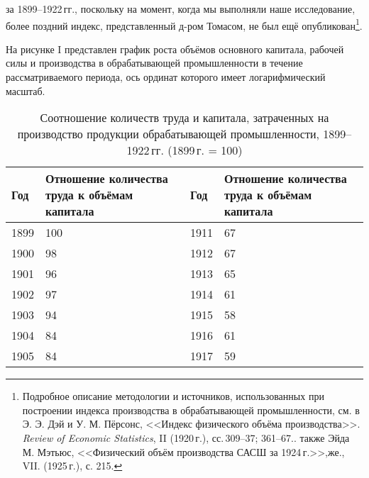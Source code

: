 \documentclass[leqno]{article}  %
\begin{document}
за 1899--1922\,гг., поскольку на момент, когда мы выполняли наше исследование, более поздний индекс, представленный д-ром Томасом, не был ещё опубликован\footnote{Подробное описание методологии и источников, использованных при построении индекса производства в обрабатывающей промышленности, см. в Э. Э. Дэй и У. М. Пёрсонс, <<Индекс физического объёма производства>>. \emph{Review of Economic Statistics}, II (1920\,г.), сс.\,309--37; 361--67.. также Эйда М. Мэтьюс, <<Физический объём производства САСШ за 1924\,г.>>, же., VII. (1925\,г.), с. 215.}.
\par
На рисунке I представлен график роста объёмов основного капитала, рабочей силы и производства в обрабатывающей промышленности в течение рассматриваемого периода, ось ординат которого имеет логарифмический масштаб.
\begin{table}
\centering
\footnotesize{
\caption{Соотношение количеств труда и капитала, затраченных на производство продукции обрабатывающей промышленности, 1899--1922\,гг. (1899\,г. = 100)}%
\label{tab5}%
\begin{tabular}{p{}|p{}||p{}|p{}}
\hline
Год & Отношение количества труда к объёмам капитала & Год & Отношение количества труда к объёмам капитала \\
\hline
1899 & \hfill 100 & \hspace*{2.5mm} 1911 & \hfill 67 \hspace*{2.5mm} \\
1900 & \hfill 98 & \hspace*{2.5mm} 1912 & \hfill 67 \hspace*{2.5mm} \\
1901 & \hfill 96 & \hspace*{2.5mm} 1913 & \hfill 65 \hspace*{2.5mm} \\
1902 & \hfill 97 & \hspace*{2.5mm} 1914 & \hfill 61 \hspace*{2.5mm} \\
1903 & \hfill 94 & \hspace*{2.5mm} 1915 & \hfill 58 \hspace*{2.5mm} \\
1904 & \hfill 84 & \hspace*{2.5mm} 1916 & \hfill 61 \hspace*{2.5mm} \\
1905 & \hfill 84 & \hspace*{2.5mm} 1917 & \hfill 59 \hspace*{2.5mm} \\

\end{tabular}}
\end{table}
\end{document}
